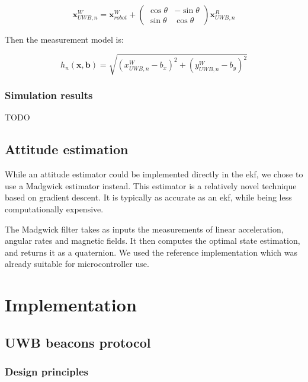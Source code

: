 \documentclass[a4paper, 12pt]{scrreprt}
\begin{document}
\begin{equation}
\mathbf{x}_{UWB,n}^W = \mathbf{x}_{robot}^W + \begin{pmatrix}
\cos \theta & - \sin \theta \\
\sin \theta & \cos \theta
\end{pmatrix} \mathbf{x}_{UWB,n}^R
\end{equation}

Then the measurement model is:

\begin{equation}
h_n(\mathbf{x}, \mathbf{b}) = \sqrt{(x_{UWB,n}^W - b_x)^2 + (y_{UWB,n}^W - b_y)^2}
\end{equation}

\subsection{Simulation results}
TODO


\section{Attitude estimation}

While an attitude estimator could be implemented directly in the \gls{ekf}, we chose to use a Madgwick estimator instead.
This estimator is a relatively novel technique based on gradient descent.
It is typically as accurate as an \gls{ekf}, while being less computationally expensive\cite{madgwick2011estimation}.

The Madgwick filter takes as inputs the measurements of linear acceleration, angular rates and magnetic fields.
It then computes the optimal state estimation, and returns it as a quaternion.
We used the reference implementation\cite{madgwick2011estimation} which was already suitable for microcontroller use.

\chapter{Implementation}

\section{UWB beacons protocol}

\subsection{Design principles}
\end{document}
